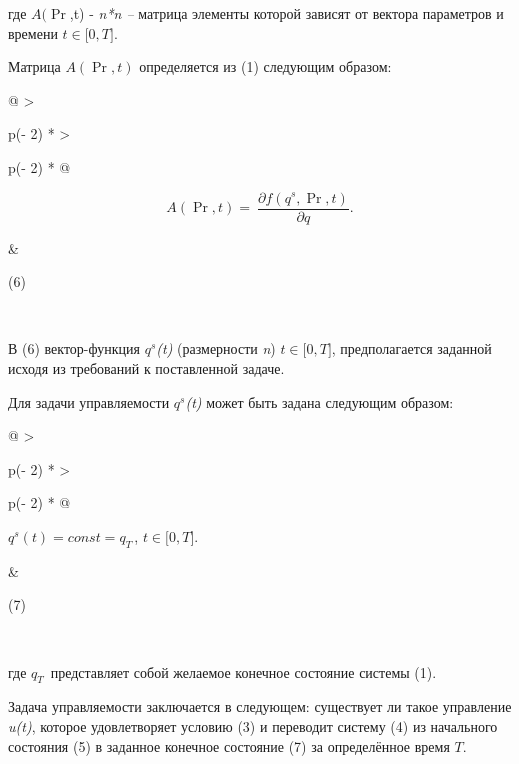 где \(A(\Pr\),t) - \emph{n*n --} матрица элементы которой зависят от
вектора параметров и времени \(t \in \lbrack 0,T\rbrack\).

Матрица \(A\left( \Pr,t \right)\) определяется из (1) следующим образом:

\begin{longtable}[]{@{}
  >{\raggedright\arraybackslash}p{(\columnwidth - 2\tabcolsep) * }
  >{\raggedright\arraybackslash}p{(\columnwidth - 2\tabcolsep) * }@{}}
\toprule\noalign{}
\begin{minipage}[b]{\linewidth}\raggedright
\[A\left( \Pr,t \right) = \ \frac{\partial f\left( q^{s},\Pr,t \right)}{\partial q}.\]
\end{minipage} & \begin{minipage}[b]{\linewidth}\raggedright
(6)
\end{minipage} \\
\midrule\noalign{}
\endhead
\bottomrule\noalign{}
\endlastfoot
\end{longtable}

В (6) вектор-функция \(q^{s}\)\emph{(t)} (размерности \emph{n})
\(t \in \lbrack 0,T\rbrack\), предполагается заданной исходя из
требований к поставленной задаче.

Для задачи управляемости \(q^{s}\)\emph{(t)} может быть задана следующим
образом:

\begin{longtable}[]{@{}
  >{\raggedright\arraybackslash}p{(\columnwidth - 2\tabcolsep) * }
  >{\raggedright\arraybackslash}p{(\columnwidth - 2\tabcolsep) * }@{}}
\toprule\noalign{}
\begin{minipage}[b]{\linewidth}\raggedright
\(q^{s}(t) = const = q_{T\ }\), \(t \in \lbrack 0,T\rbrack\).
\end{minipage} & \begin{minipage}[b]{\linewidth}\raggedright
(7)
\end{minipage} \\
\midrule\noalign{}
\endhead
\bottomrule\noalign{}
\endlastfoot
\end{longtable}

где \(q_{T\ }\) представляет собой желаемое конечное состояние системы
(1).

Задача управляемости заключается в следующем: существует ли такое
управление \emph{u(t)}, которое удовлетворяет условию (3) и переводит
систему (4) из начального состояния (5) в заданное конечное состояние
(7) за определённое время \(T.\)

